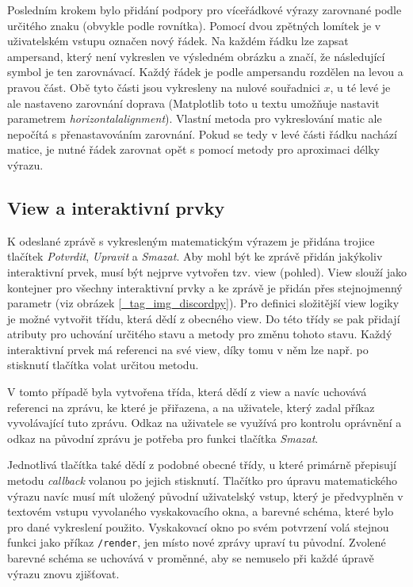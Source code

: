 \documentclass[FM]{tulthesis}
\begin{document}
	Posledním krokem bylo přidání podpory pro víceřádkové výrazy zarovnané podle určitého znaku (obvykle podle rovnítka). Pomocí dvou zpětných lomítek je v uživatelském vstupu označen nový řádek. Na každém řádku lze zapsat ampersand, který není vykreslen ve výsledném obrázku a značí, že následující symbol je ten zarovnávací. Každý řádek je podle ampersandu rozdělen na levou a pravou část. Obě tyto části jsou vykresleny na nulové souřadnici $x$, u té levé je ale nastaveno zarovnání doprava (Matplotlib toto u textu umožňuje nastavit parametrem \textit{horizontalalignment}). Vlastní metoda pro vykreslování matic ale nepočítá s přenastavováním zarovnání. Pokud se tedy v levé části řádku nachází matice, je nutné řádek zarovnat opět s pomocí metody pro aproximaci délky výrazu. %
	
	\subsection{View a interaktivní prvky}
	
	K odeslané zprávě s vykresleným matematickým výrazem je přidána trojice tlačítek \textit{Potvrdit}, \textit{Upravit} a \textit{Smazat}. Aby mohl být ke zprávě přidán jakýkoliv interaktivní prvek, musí být nejprve vytvořen tzv. view (pohled). View slouží jako kontejner pro všechny interaktivní prvky a ke zprávě je přidán přes stejnojmenný parametr (viz obrázek \ref{_tag_img_discordpy}). Pro definici složitější view logiky je možné vytvořit třídu, která dědí z obecného view. Do této třídy se pak přidají atributy pro uchování určitého stavu a metody pro změnu tohoto stavu. Každý interaktivní prvek má referenci na své view, díky tomu v něm lze např. po stisknutí tlačítka volat určitou metodu.
	
	V tomto případě byla vytvořena třída, která dědí z view a navíc uchovává referenci na zprávu, ke které je přiřazena, a na uživatele, který zadal příkaz vyvolávající tuto zprávu. Odkaz na uživatele se využívá pro kontrolu oprávnění a odkaz na původní zprávu je potřeba pro funkci tlačítka \textit{Smazat}.
	
	Jednotlivá tlačítka také dědí z podobné obecné třídy, u které primárně přepisují metodu \textit{callback} volanou po jejich stisknutí. Tlačítko pro úpravu matematického výrazu navíc musí mít uložený původní uživatelský vstup, který je předvyplněn v textovém vstupu vyvolaného vyskakovacího okna, a barevné schéma, které bylo pro dané vykreslení použito. Vyskakovací okno po svém potvrzení volá stejnou funkci jako příkaz \verb*|/render|, jen místo nové zprávy upraví tu původní. Zvolené barevné schéma se uchovává v proměnné, aby se nemuselo při každé úpravě výrazu znovu zjišťovat.
	
\end{document}
